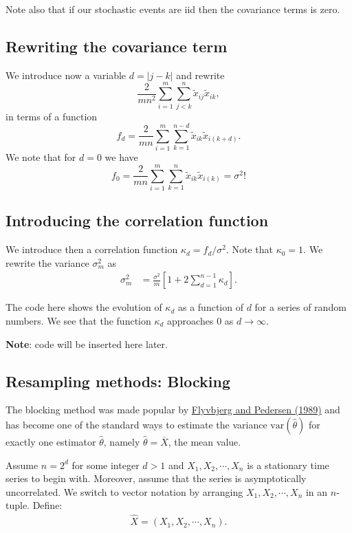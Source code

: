 \documentclass[%
oneside,                 %
final,                   %
10pt]{article}
\begin{document}
Note also that if our stochastic events are iid then the covariance terms is zero.

\subsection{Rewriting the covariance term}

We introduce now a variable $d=\vert j-k\vert $ and rewrite 
\[
\frac{2}{mn^2}\sum_{i=1}^{m} \sum_{j<k}^{n}\tilde{x}_{ij}\tilde{x}_{ik},
\]
in terms of a function
\[
f_d=\frac{2}{mn}\sum_{i=1}^{m} \sum_{k=1}^{n-d}\tilde{x}_{ik}\tilde{x}_{i(k+d)}.
\]
We note that for $d=0$ we have
\[
f_0=\frac{2}{mn}\sum_{i=1}^{m} \sum_{k=1}^{n}\tilde{x}_{ik}\tilde{x}_{i(k)}=\sigma^2!
\]

\subsection{Introducing the correlation function}

We introduce then a correlation function $\kappa_d=f_d/\sigma^2$. Note that $\kappa_0 =1$.  We rewrite the variance $\sigma_m^2$ as
\begin{align*}
\sigma^2_{m}& = \frac{\sigma^2}{m}\left[1+2\sum_{d=1}^{n-1} \kappa_d\right].
\end{align*}

The code here shows the evolution of $\kappa_d$ as a function of $d$ for a series of random numbers. We see that the function $\kappa_d$ approaches $0$ as $d\rightarrow \infty$.

\textbf{Note}: code will be inserted here later.

\subsection{Resampling methods: Blocking}

The blocking method was made popular by \href{{https://aip.scitation.org/doi/10.1063/1.457480}}{Flyvbjerg and Pedersen (1989)}
and has become one of the standard ways to estimate the variance
$\mathrm{var}(\widehat{\theta})$ for exactly one estimator $\widehat{\theta}$, namely
$\widehat{\theta} = \overline{X}$, the mean value. 

Assume $n = 2^d$ for some integer $d>1$ and $X_1,X_2,\cdots, X_n$ is a stationary time series to begin with. 
Moreover, assume that the series is asymptotically uncorrelated. We switch to vector notation by arranging $X_1,X_2,\cdots,X_n$ in an $n$-tuple. Define:
\begin{align*}
\hat{X} = (X_1,X_2,\cdots,X_n).
\end{align*}
\end{document}

